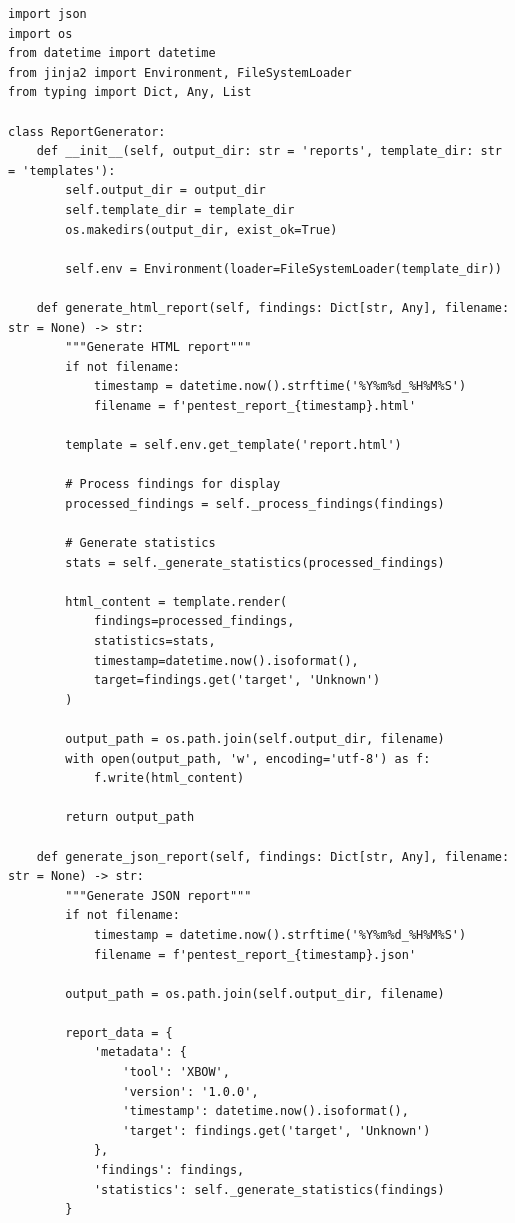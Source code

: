 \documentclass[12pt,a4paper]{report}
\begin{document}
\begin{lstlisting}[caption=Report Generator Implementation]
import json
import os
from datetime import datetime
from jinja2 import Environment, FileSystemLoader
from typing import Dict, Any, List

class ReportGenerator:
    def __init__(self, output_dir: str = 'reports', template_dir: str = 'templates'):
        self.output_dir = output_dir
        self.template_dir = template_dir
        os.makedirs(output_dir, exist_ok=True)
        
        self.env = Environment(loader=FileSystemLoader(template_dir))
        
    def generate_html_report(self, findings: Dict[str, Any], filename: str = None) -> str:
        """Generate HTML report"""
        if not filename:
            timestamp = datetime.now().strftime('%Y%m%d_%H%M%S')
            filename = f'pentest_report_{timestamp}.html'
            
        template = self.env.get_template('report.html')
        
        # Process findings for display
        processed_findings = self._process_findings(findings)
        
        # Generate statistics
        stats = self._generate_statistics(processed_findings)
        
        html_content = template.render(
            findings=processed_findings,
            statistics=stats,
            timestamp=datetime.now().isoformat(),
            target=findings.get('target', 'Unknown')
        )
        
        output_path = os.path.join(self.output_dir, filename)
        with open(output_path, 'w', encoding='utf-8') as f:
            f.write(html_content)
            
        return output_path
    
    def generate_json_report(self, findings: Dict[str, Any], filename: str = None) -> str:
        """Generate JSON report"""
        if not filename:
            timestamp = datetime.now().strftime('%Y%m%d_%H%M%S')
            filename = f'pentest_report_{timestamp}.json'
            
        output_path = os.path.join(self.output_dir, filename)
        
        report_data = {
            'metadata': {
                'tool': 'XBOW',
                'version': '1.0.0',
                'timestamp': datetime.now().isoformat(),
                'target': findings.get('target', 'Unknown')
            },
            'findings': findings,
            'statistics': self._generate_statistics(findings)
        }
        

\end{lstlisting}
\end{document}
